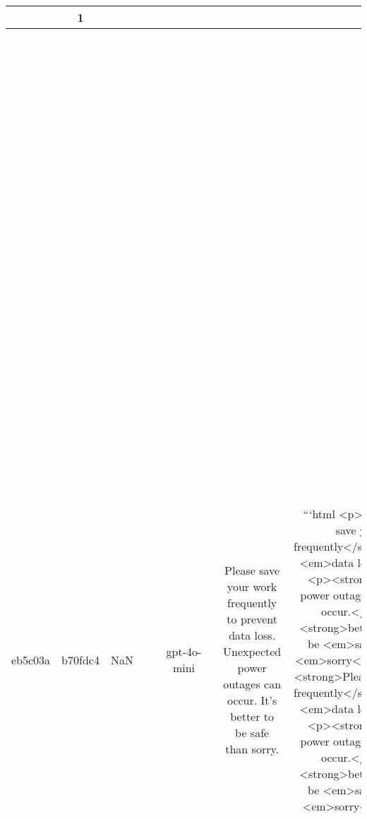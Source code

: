 \begin{table}[h!]
\begin{tabular}{|c|c|c|c|c|c|c|c|c|c|}
{{Thus, the output satisfies the outlined requirements. Therefore, there is no non-compliance with the rules provided.

OK & 1\\
\hline
eb5c03a & b70fdc4 & NaN &  & gpt-4o-mini & Please save your work frequently to prevent data loss. Unexpected power outages can occur. It's better to be safe than sorry. & ```html
<p><strong>Please save your work frequently</strong> to prevent <em>data loss</em>.</p>
<p><strong>Unexpected power outages</strong> can occur.</p>
<p>It's <strong>better</strong> to be <em>safe</em> than <em>sorry</em>.</p>
<p><strong>Please save your work frequently</strong> to prevent <em>data loss</em>.</p>
<p><strong>Unexpected power outages</strong> can occur.</p>
<p>It's <strong>better</strong> to be <em>safe</em> than <em>sorry</em>.</p>
``` & ok & The output contains six <p> tags. The guideline specifies that the output should have at least three <p> tags, which is satisfied in this output.

Each sentence is wrapped in a <p> tag, and within those <p> tags, there is usage of <strong> and <em> tags to emphasize key elements. This aligns with the guideline that inside each <p> tag, one <strong> tag and multiple <em> tags should be used. Each paragraph has at least one <strong> tag and at least one <em> tag, satisfying the requirement for emphasizing key words or phrases.

As none of these checks require knowledge of the input, the output adheres strictly to the guidelines provided, thus complying with the description.

No violation.
OK & 1\\
\hline
eb5c03a & b70fdc4 & NaN &  & gemma2:9b & Please save your work frequently to prevent data loss. Unexpected power outages can occur. It's better to be safe than sorry. & Here is the HTML code with the paragraph formatted as requested:

<p><strong>Unexpected</strong> power outages <em>can</em> <em>occur</em>.</p>
<p>It's <strong>better</strong> to be <em>safe</em> than <em>sorry</em>.</p>
<p>Please save your work frequently to prevent data loss. </p>



Let me know if you would like any further modifications or have other text you'd like formatted! 
 & err & The chatbot's output consists of three sentences each wrapped in a `<p>` tag. This satisfies the requirement that there are at least three `<p>` tags. Each `<p>` tag contains either a `<strong>` tag or multiple `<em>` tags or both, with the exception of the last `<p>` tag. The last sentence wrapped in a `<p>` tag does not contain any `<strong>` or `<em>` tags, which is a violation of the requirement that inside each `<p>` tag, there should be one `<strong>` tag and multiple `<em>` tags to emphasize key words and phrases. 

}}
\end{tabular}
\end{table}
